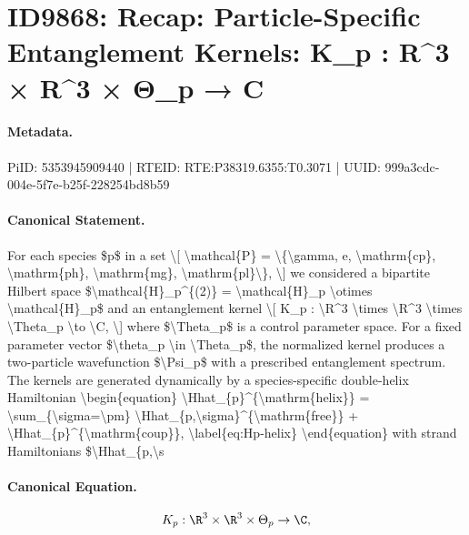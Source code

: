 \section*{ID9868: Recap: Particle-Specific Entanglement Kernels: K\_p : R\textasciicircum{}3 × R\textasciicircum{}3 × Θ\_p → C}
\paragraph{Metadata.}
PiID: 5353945909440 | RTEID: RTE:P38319.6355:T0.3071 | UUID: 999a3cdc-004e-5f7e-b25f-228254bd8b59

\paragraph{Canonical Statement.}
For each species \$p\$ in a set \textbackslash{}[ \textbackslash{}mathcal\{P\} = \textbackslash{}\{\textbackslash{}gamma, e, \textbackslash{}mathrm\{cp\}, \textbackslash{}mathrm\{ph\}, \textbackslash{}mathrm\{mg\}, \textbackslash{}mathrm\{pl\}\textbackslash{}\}, \textbackslash{}] we considered a bipartite Hilbert space \$\textbackslash{}mathcal\{H\}\_p\textasciicircum{}\{(2)\} = \textbackslash{}mathcal\{H\}\_p \textbackslash{}otimes \textbackslash{}mathcal\{H\}\_p\$ and an entanglement kernel \textbackslash{}[ K\_p : \textbackslash{}R\textasciicircum{}3 \textbackslash{}times \textbackslash{}R\textasciicircum{}3 \textbackslash{}times \textbackslash{}Theta\_p \textbackslash{}to \textbackslash{}C, \textbackslash{}] where \$\textbackslash{}Theta\_p\$ is a control parameter space. For a fixed parameter vector \$\textbackslash{}theta\_p \textbackslash{}in \textbackslash{}Theta\_p\$, the normalized kernel produces a two-particle wavefunction \$\textbackslash{}Psi\_p\$ with a prescribed entanglement spectrum. The kernels are generated dynamically by a species-specific double-helix Hamiltonian \textbackslash{}begin\{equation\} \textbackslash{}Hhat\_\{p\}\textasciicircum{}\{\textbackslash{}mathrm\{helix\}\} = \textbackslash{}sum\_\{\textbackslash{}sigma=\textbackslash{}pm\} \textbackslash{}Hhat\_\{p,\textbackslash{}sigma\}\textasciicircum{}\{\textbackslash{}mathrm\{free\}\} + \textbackslash{}Hhat\_\{p\}\textasciicircum{}\{\textbackslash{}mathrm\{coup\}\}, \textbackslash{}label\{eq:Hp-helix\} \textbackslash{}end\{equation\} with strand Hamiltonians \$\textbackslash{}Hhat\_\{p,\textbackslash{}s

\paragraph{Canonical Equation.}
\[
K_p : \R^3 \times \R^3 \times \Theta_p \to \C,
\]

